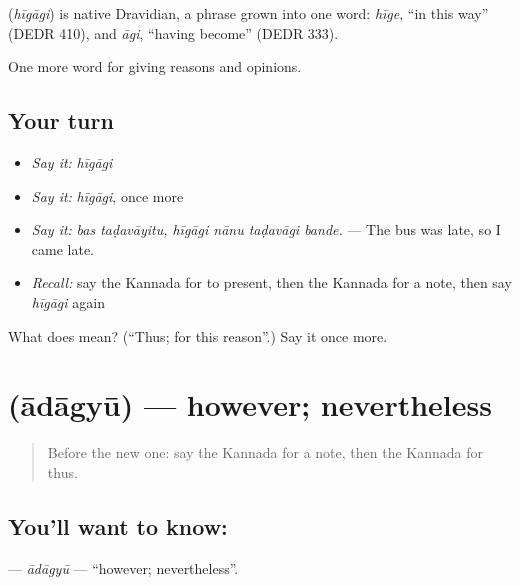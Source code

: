 \begin{cousinweb}
\textbf{} (\emph{hīgāgi}) is native Dravidian, a phrase grown into one word: \emph{hīge}, \textquotedblleft{}in this way\textquotedblright{} (DEDR 410), and \emph{āgi}, \textquotedblleft{}having become\textquotedblright{} (DEDR 333).
\end{cousinweb}

\begin{grammarlens}[title={What you've built}]
One more word for giving reasons and opinions.
\end{grammarlens}

\subsection*{Your turn}
\begin{itemize}
\raggedright
  \item \emph{Say it:} \emph{hīgāgi}
  \item \emph{Say it:} \emph{hīgāgi}, once more
  \item \emph{Say it:} \emph{bas taḍavāyitu, hīgāgi nānu taḍavāgi bande.} — The bus was late, so I came late.
  \item \emph{Recall:} say the Kannada for to present, then the Kannada for a note, then say \emph{hīgāgi} again
\end{itemize}

\begin{tcolorbox}[breakable,colback=teal!4,colframe=teal!35!black,title={Before you move on}]
What does  mean? (\textquotedblleft{}Thus; for this reason\textquotedblright{}.) Say it once more.
\end{tcolorbox}
\section[\texorpdfstring{\kn{ಆದಾಗ್ಯೂ} (ādāgyū)}{ಆದಾಗ್ಯೂ (ādāgyū)}]{ (ādāgyū) — however; nevertheless}

\label{lesson:KA-C410-adagyu}



\begin{quote}
Before the new one: say the Kannada for a note, then the Kannada for thus.
\end{quote}

\subsection*{You'll want to know: }
\textbf{} — \emph{ādāgyū} — \textquotedblleft{}however; nevertheless\textquotedblright{}.

